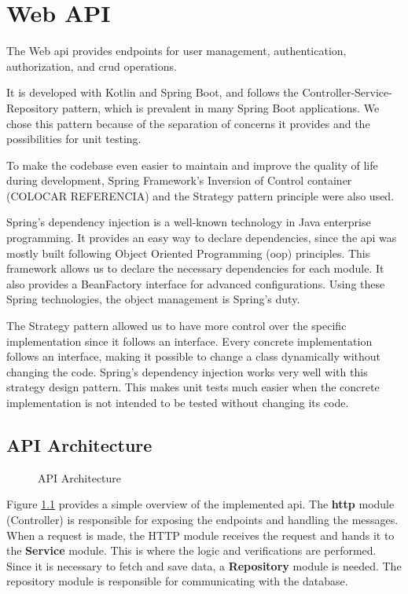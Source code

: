 \chapter{Web API} \label{cap:web_api}
The Web \ac{api} provides endpoints for user management, authentication, authorization, and \ac{crud} operations. 

It is developed with Kotlin and Spring Boot, and follows the Controller-Service-Repository pattern, which is prevalent in many Spring Boot applications. We chose this pattern because of the separation of concerns it provides and the possibilities for unit testing.

To make the codebase even easier to maintain and improve the quality of life during development, Spring Framework's Inversion of Control container (COLOCAR REFERENCIA) and the Strategy pattern principle were also used. 

Spring's dependency injection is a well-known technology in Java enterprise programming. It provides an easy way to declare dependencies, since the \ac{api} was mostly built following Object Oriented Programming (\ac{oop}) principles. This framework allows us to declare the necessary dependencies for each module. It also provides a BeanFactory interface for advanced configurations. Using these Spring technologies, the object management is Spring's duty.

The Strategy pattern allowed us to have more control over the specific implementation since it follows an interface. Every concrete implementation follows an interface, making it possible to change a class dynamically without changing the code. Spring's dependency injection works very well with this strategy design pattern. This makes unit tests much easier when the concrete implementation is not intended to be tested without changing its code.

\section{API Architecture}

\begin{figure}[H]
    \centering
    
    \caption{API Architecture}
    \label{fig:api_architecture}
\end{figure}

Figure \ref{fig:api_architecture} provides a simple overview of the implemented \acs{api}. The \textbf{\ac{http}} module (Controller) is responsible for exposing the endpoints and handling the messages. When a request is made, the HTTP module receives the request and hands it to the \textbf{Service} module. This is where the logic and verifications are performed. Since it is necessary to fetch and save data, a \textbf{Repository} module is needed. The repository module is responsible for communicating with the database.

